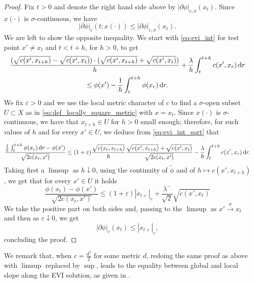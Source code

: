 \documentclass[reqno]{amsart}
\theoremstyle{plain}
\theoremstyle{remark}
\theoremstyle{plain}
\numberwithin{equation}{section}
\theoremstyle{remark}
\newcommand{\eps}{\varepsilon}
\newcommand{\de}{{\,\rm d}}
\begin{document}
\begin{proof} Fix $t>0$ and denote the right hand side above by $|\partial \phi|_{c, \sigma}(x_{t})$. Since $x(\cdot)$ is $\sigma$-continuous, we have
    \begin{equation}
        |\partial \phi|_c(t;x(\cdot)) \le |\partial \phi|_{c, \sigma}(x_{t}).
    \end{equation}
    We are left to show the opposite inequality.
     We start with \eqref{eq:evi_int} for test point $x'\neq x_t$ and $t<t+h$, for $h>0$, to get
    \begin{multline}
    \frac{(\sqrt{c(x',x_{t+h})}-\sqrt{c(x',x_{t})})\cdot (\sqrt{c(x',x_{t+h})}+\sqrt{c(x',x_{t})})}{h} + \frac{\lambda}{h}\int_{t}^{t+h} c(x',x_r) \de r \\
    \le \phi(x')-\frac{1}{h}\int_{t}^{t+h} \phi(x_r) \de r.    \label{eq:evi_int_sqrt}
    \end{multline}
    We fix $\eps>0$ and we use the local metric character of $c$ to find a $\sigma$-open subset $U\subset X$ as in \eqref{eq:def_locally_square_metric} with $x=x_t$. Since $x(\cdot)$ is $\sigma$-continuous, we have that $x_{t+h} \in U$ for $h>0$ small enough; therefore, for such values of $h$ and for every $x' \in U$, we deduce from \eqref{eq:evi_int_sqrt} that
    
\begin{equation}
    \frac{\frac{1}{h}\int_{t}^{t+h} \phi(x_r) \de r -\phi(x')}{\sqrt{2c(x_t, x')}} \le  (1+\eps) \frac{\sqrt{c(x_t, x_{t+h})}}{h} \frac{\sqrt{c(x',x_{t+h})}+\sqrt{c(x',x_{t})}}{\sqrt{2c(x_t, x')}} - \frac{\lambda}{h} \int_t^{t+h}c(x',x_r) \de r \label{eq:evi_int_sqrt2}.
\end{equation}
Taking first a $\limsup$ as $h \downarrow 0$, using the continuity of $\tilde \phi$ and of $h \mapsto c(x',x_{t+h})$, we get that for every $x' \in U$ it holds
   \[
   \frac{\phi(x_t)-\phi(x')}{\sqrt{2 c(x_{t},x')}} \le (1+\eps) |\dot x_{t+ }|_c +\frac{\lambda^-}{\sqrt{2}} \sqrt{c(x',x_t)}
   \]
   We take the positive part on both sides and, passing to the $\limsup$ as $x' \stackrel{\sigma}{\to} x_{t}$ and then as $\eps \downarrow 0$, we get
    \begin{equation}
        |\partial \phi|_c(x_{t})\le |\dot x_{t+ }|_c,
    \end{equation}
    concluding the proof.
\end{proof}
We remark that, when $c=\frac{d^2}{2}$ for some metric $d$, redoing the same proof as above with $\limsup$ replaced by $\sup$, leads to the equality between global and local slope along the EVI solution, as given in \cite[formula (3.17)]{MuratoriSavare}.
\end{document}
